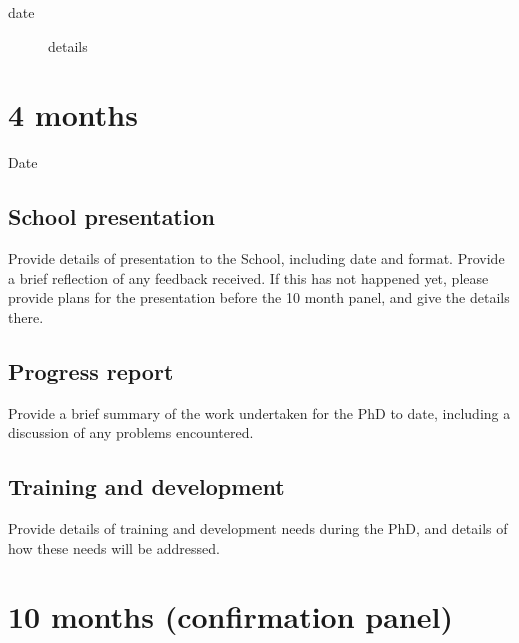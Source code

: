 \documentclass[12pt,a4paper]{article}
\begin{document}

\begin{description}
	\item[date] details
\end{description}


\section{4 months}

\begin{description}
	\item[Date] %
\end{description}

\subsection{School presentation}
Provide details of presentation to the School, including date and format. Provide a brief reflection of any feedback received. If this has not happened yet, please provide plans for the presentation before the 10 month panel, and give the details there.

\subsection{Progress report}
Provide a brief summary of the work undertaken for the PhD to date, including a discussion of any problems encountered. %

\subsection{Training and development}
Provide details of training and development needs during the PhD, and details of how these needs will be addressed. %


\section{10 months (confirmation panel)}
\end{document}
